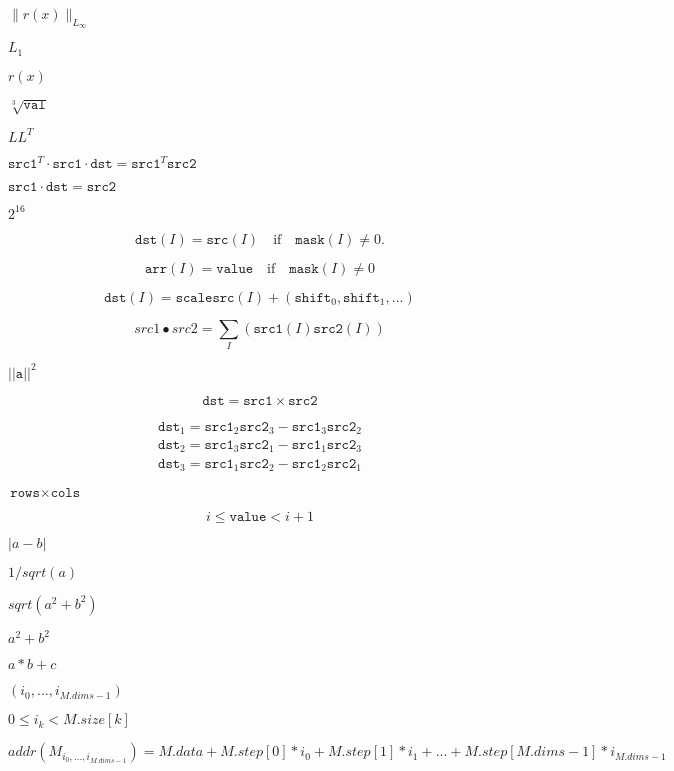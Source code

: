 \documentclass{article}
\begin{document}
$\| r(x) \|_{L_\infty}$
\pagebreak

$ L_{1} $
\pagebreak

$ r(x) $
\pagebreak

$\sqrt[3]{\texttt{val}}$
\pagebreak

$LL^T$
\pagebreak

$\texttt{src1}^T\cdot\texttt{src1}\cdot\texttt{dst}=\texttt{src1}^T\texttt{src2}$
\pagebreak

$\texttt{src1}\cdot\texttt{dst}=\texttt{src2}$
\pagebreak

$2^{16}$
\pagebreak

\[\texttt{dst} (I)= \texttt{src} (I) \quad \text{if} \quad \texttt{mask} (I) \ne 0.\]
\pagebreak

\[\texttt{arr} (I)= \texttt{value} \quad \text{if} \quad \texttt{mask} (I) \ne 0\]
\pagebreak

\[\texttt{dst} (I) = \texttt{scale} \texttt{src} (I) + ( \texttt{shift} _0, \texttt{shift} _1,...)\]
\pagebreak

\[src1 \bullet src2 = \sum _I ( \texttt{src1} (I) \texttt{src2} (I))\]
\pagebreak

$||\texttt{a}||^2$
\pagebreak

\[\texttt{dst} = \texttt{src1} \times \texttt{src2}\]
\pagebreak

\[\begin{array}{l} \texttt{dst} _1 = \texttt{src1} _2 \texttt{src2} _3 - \texttt{src1} _3 \texttt{src2} _2 \\ \texttt{dst} _2 = \texttt{src1} _3 \texttt{src2} _1 - \texttt{src1} _1 \texttt{src2} _3 \\ \texttt{dst} _3 = \texttt{src1} _1 \texttt{src2} _2 - \texttt{src1} _2 \texttt{src2} _1 \end{array}\]
\pagebreak

$\texttt{rows} \times \texttt{cols}$
\pagebreak

\[i \le \texttt{value} < i+1\]
\pagebreak

$ |a - b| $
\pagebreak

$ 1/sqrt(a) $
\pagebreak

$ sqrt(a^2 + b^2) $
\pagebreak

$ a^2 + b^2 $
\pagebreak

$ a*b + c $
\pagebreak

$(i_0,...,i_{M.dims-1})$
\pagebreak

$0\leq i_k<M.size[k]$
\pagebreak

\[addr(M_{i_0,...,i_{M.dims-1}}) = M.data + M.step[0]*i_0 + M.step[1]*i_1 + ... + M.step[M.dims-1]*i_{M.dims-1}\]
\pagebreak
\end{document}
